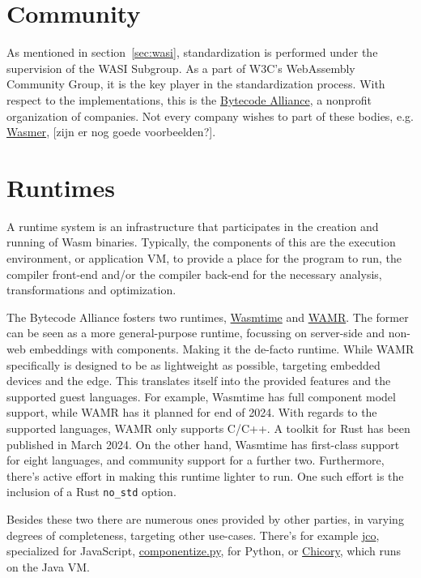 \section{Community}
\label{sec:community}

As mentioned in section~\ref{sec:wasi}, standardization is performed under the supervision of the \gls{WASI} Subgroup. As a part of W3C's WebAssembly Community Group, it is the key player in the standardization process. With respect to the implementations, this is the \href{https://bytecodealliance.org/}{Bytecode Alliance}, a nonprofit organization of companies. Not every company wishes to part of these bodies, e.g. \href{https://wasmer.io/}{Wasmer}, [zijn er nog goede voorbeelden?].

\section{Runtimes}
\label{sec:runtimes}

A runtime system is an infrastructure that participates in the creation and running of \gls{Wasm} binaries. Typically, the components of this are the execution environment, or application \gls{VM}, to provide a place for the program to run, the compiler front-end and/or the compiler back-end for the necessary analysis, transformations and optimization.

The Bytecode Alliance fosters two runtimes, \href{https://github.com/bytecodealliance/wasmtime}{Wasmtime} and \href{https://github.com/bytecodealliance/wasm-micro-runtime}{WAMR}. The former can be seen as a more general-purpose runtime, focussing on server-side and non-web embeddings with components. Making it the de-facto runtime. While \gls{WAMR} specifically is designed to be as lightweight as possible, targeting embedded devices and the edge. This translates itself into the provided features and the supported guest languages. For example, Wasmtime has full component model support, while \gls{WAMR} has it planned for end of 2024. With regards to the supported languages, \gls{WAMR} only supports C/C++. A toolkit for Rust has been published in March 2024. On the other hand, Wasmtime has first-class support for eight languages, and community support for a further two. Furthermore, there's active effort in making this runtime lighter to run. One such effort is the inclusion of a Rust \texttt{no\_std} option.

Besides these two there are numerous ones provided by other parties, in varying degrees of completeness, targeting other use-cases. There's for example \href{https://github.com/bytecodealliance/jco}{jco}, specialized for JavaScript, \href{https://github.com/bytecodealliance/componentize-py}{componentize.py}, for Python, or \href{https://github.com/dylibso/chicory}{Chicory}, which runs on the Java \gls{VM}. 
